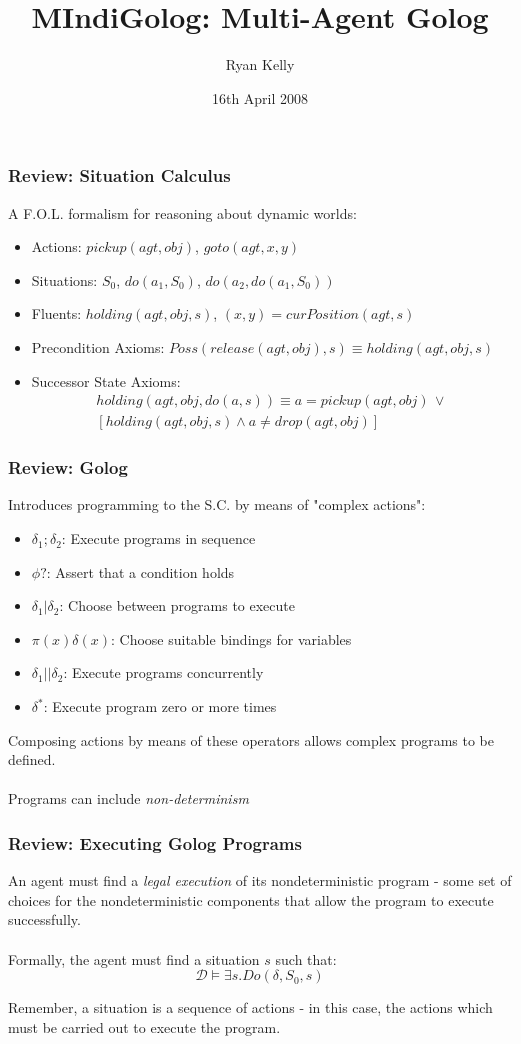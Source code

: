 \documentclass[compress]{beamer}
\title{MIndiGolog: Multi-Agent Golog}
\author{Ryan Kelly}
\institute[The University of Melbourne]
{
  rfk@csse.unimelb.edu.au
}
\date[]
{16th April 2008}
\begin{document}
\begin{frame}
  \titlepage
\end{frame}

\begin{frame}
\frametitle{Review: Situation Calculus}

A F.O.L. formalism for reasoning about dynamic worlds:

\begin{itemize}
\item Actions: $pickup(agt,obj)$, $goto(agt,x,y)$
\item Situations: $S_{0}$, $do(a_{1},S_{0})$, $do(a_{2},do(a_{1},S_{0}))$
\item Fluents: $holding(agt,obj,s)$, $(x,y)=curPosition(agt,s)$
\item Precondition Axioms: $Poss(release(agt,obj),s) \equiv holding(agt,obj,s)$
\item Successor State Axioms:
\begin{multline*}
holding(agt,obj,do(a,s))\equiv a=pickup(agt,obj)\,\vee\\
\left[holding(agt,obj,s)\wedge a\neq drop(agt,obj)\right]
\end{multline*}
\end{itemize}
\end{frame}

\begin{frame}
\frametitle{Review: Golog}
Introduces programming to the S.C. by means of "complex actions":
\begin{itemize}
  \item $\delta_1;\delta_2$: Execute programs in sequence
  \item $\phi?$: Assert that a condition holds
  \item $\delta_1|\delta_2$: Choose between programs to execute
  \item $\pi(x)\delta(x)$: Choose suitable bindings for variables
  \item $\delta_1||\delta_2$: Execute programs concurrently
  \item $\delta^*$: Execute program zero or more times
\end{itemize}
Composing actions by means of these operators allows complex programs
to be defined.\\
\ \\
Programs can include \emph{non-determinism}
\end{frame}

\begin{frame}
\frametitle{Review: Executing Golog Programs}
An agent must find a \emph{legal execution} of its nondeterministic
program - some set of choices for the nondeterministic components that allow
the program to execute successfully.\\
\ \\
Formally, the agent must find a situation $s$ such that:\[
\mathcal{D} \models \exists s . Do(\delta,S_0,s)\]


Remember, a situation is a sequence of actions - in this case, the actions which must be carried out to execute the program.
\end{frame}
\end{document}

